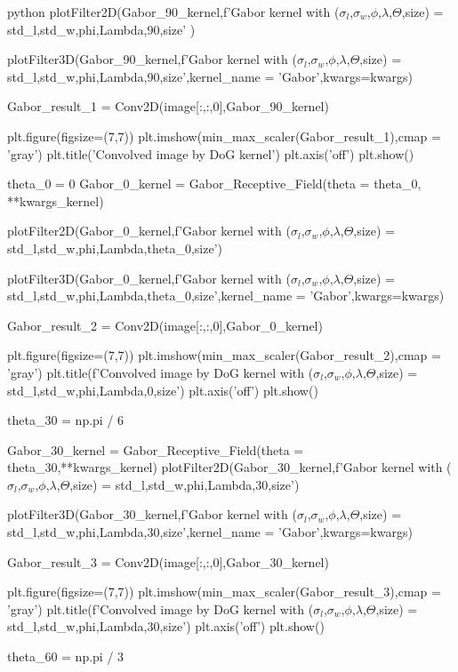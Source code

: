 \documentclass[12pt]{amsart}
\begin{document}
\begin{mintedbox}{python}
plotFilter2D(Gabor_90_kernel,f'Gabor kernel with \n ($\sigma_l$,$\sigma_w$,$\phi$,$\lambda$,$\Theta$,size) = {std_l,std_w,phi,Lambda,90,size}'
)



plotFilter3D(Gabor_90_kernel,f'Gabor kernel with \n ($\sigma_l$,$\sigma_w$,$\phi$,$\lambda$,$\Theta$,size) = {std_l,std_w,phi,Lambda,90,size}',kernel_name = 'Gabor',kwargs=kwargs)


Gabor_result_1 = Conv2D(image[:,:,0],Gabor_90_kernel)

plt.figure(figsize=(7,7))
plt.imshow(min_max_scaler(Gabor_result_1),cmap = 'gray')
plt.title('Convolved image by DoG kernel')
plt.axis('off')
plt.show()

theta_0 = 0
Gabor_0_kernel = Gabor_Receptive_Field(theta  = theta_0, **kwargs_kernel)

plotFilter2D(Gabor_0_kernel,f'Gabor kernel with \n ($\sigma_l$,$\sigma_w$,$\phi$,$\lambda$,$\Theta$,size) = {std_l,std_w,phi,Lambda,theta_0,size}')

plotFilter3D(Gabor_0_kernel,f'Gabor kernel with \n ($\sigma_l$,$\sigma_w$,$\phi$,$\lambda$,$\Theta$,size) = {std_l,std_w,phi,Lambda,theta_0,size}',kernel_name = 'Gabor',kwargs=kwargs)


Gabor_result_2 = Conv2D(image[:,:,0],Gabor_0_kernel)


plt.figure(figsize=(7,7))
plt.imshow(min_max_scaler(Gabor_result_2),cmap = 'gray')
plt.title(f'Convolved image by DoG kernel with  \n ($\sigma_l$,$\sigma_w$,$\phi$,$\lambda$,$\Theta$,size) = {std_l,std_w,phi,Lambda,0,size}')
plt.axis('off')
plt.show()

theta_30 = np.pi / 6

Gabor_30_kernel = Gabor_Receptive_Field(theta = theta_30,**kwargs_kernel)
plotFilter2D(Gabor_30_kernel,f'Gabor kernel with \n ($\sigma_l$,$\sigma_w$,$\phi$,$\lambda$,$\Theta$,size) = {std_l,std_w,phi,Lambda,30,size}')

plotFilter3D(Gabor_30_kernel,f'Gabor kernel with \n ($\sigma_l$,$\sigma_w$,$\phi$,$\lambda$,$\Theta$,size) = {std_l,std_w,phi,Lambda,30,size}',kernel_name = 'Gabor',kwargs=kwargs)


Gabor_result_3 = Conv2D(image[:,:,0],Gabor_30_kernel)


plt.figure(figsize=(7,7))
plt.imshow(min_max_scaler(Gabor_result_3),cmap = 'gray')
plt.title(f'Convolved image by DoG kernel with  ($\sigma_l$,$\sigma_w$,$\phi$,$\lambda$,$\Theta$,size) = {std_l,std_w,phi,Lambda,30,size}')
plt.axis('off')
plt.show()

theta_60 = np.pi / 3


\end{mintedbox}
\end{document}
